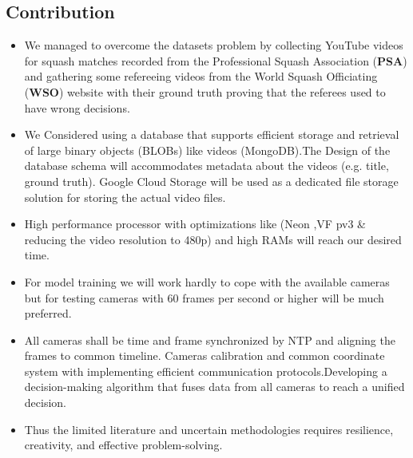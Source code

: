 \documentclass[12pt]{article}
\begin{document}
 \subsection{Contribution}
 \begin{itemize}
 \item We managed to overcome the datasets problem by collecting YouTube videos for squash matches recorded from the Professional Squash Association (\textbf{PSA}) and gathering some refereeing videos from the World Squash Officiating (\textbf{WSO}) website with their ground truth proving that the referees used to have wrong decisions.

 \item We Considered using a database that supports efficient storage and retrieval of large binary objects (BLOBs) like videos (MongoDB).The Design of the database schema will accommodates metadata about the videos (e.g. title, ground truth). Google Cloud Storage will be used as a dedicated file storage solution for storing the actual video files.

 \item High performance processor with optimizations like (Neon ,VF pv3 \& reducing the video resolution to 480p) and high RAMs will reach our desired time. 

 \item For model training we will work hardly to cope with the available cameras but for testing cameras with 60 frames per second or higher will be much preferred.

 \item All cameras shall be time and frame synchronized \cite{Multiple_Cameras} by NTP and aligning the frames to common timeline. Cameras calibration and common coordinate system with
 implementing efficient communication protocols.Developing a decision-making algorithm that fuses data from all cameras to reach a unified decision.

 \item Thus the limited literature and uncertain methodologies requires resilience, creativity, and effective problem-solving.
 \end{itemize}
\end{document}
